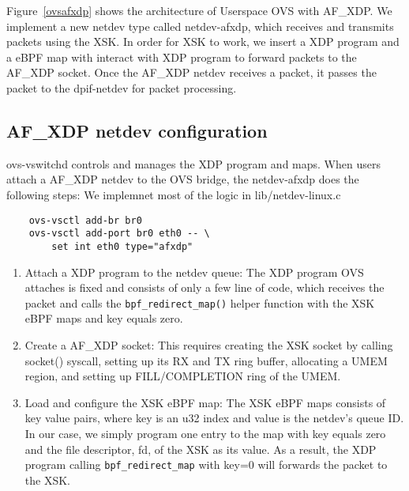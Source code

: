 \documentclass[10pt]{sigplanconf}
\newcommand{\mycomment}[1]{}
\begin{document}
Figure~\ref{ovsafxdp} shows the architecture of Userspace OVS with AF\_XDP.
We implement a new netdev type called netdev-afxdp, which receives and transmits
packets using the XSK.
In order for XSK to work, we insert a XDP program and a eBPF map with   
interact with XDP program to forward packets to the AF\_XDP socket.
Once the AF\_XDP netdev receives a packet, it passes the packet to the
dpif-netdev for packet processing.

\mycomment{
/* PMD: Poll modes drivers.  PMD accesses devices via polling to eliminate
 * the performance overhead of interrupt processing.  Therefore netdev can
 * not implement rx-wait for these devices.  dpif-netdev needs to poll
 * these device to check for recv buffer.  pmd-thread does polling for
 * devices assigned to itself.
 *
 * DPDK used PMD for accessing NIC.
 *}

\subsection{AF\_XDP netdev configuration}
ovs-vswitchd controls and manages the XDP program and maps.
When users attach a AF\_XDP netdev to the OVS bridge, the netdev-afxdp
does the following steps:
We implemnet most of the logic in lib/netdev-linux.c
{
\begin{verbatim}
    ovs-vsctl add-br br0
    ovs-vsctl add-port br0 eth0 -- \
        set int eth0 type="afxdp"
\end{verbatim}
}
\begin{enumerate}
\item Attach a XDP program to the netdev queue:
The XDP program OVS attaches is fixed and consists
of only a few line of code, which receives the packet and
calls the \texttt{bpf\_redirect\_map()} helper function with
the XSK eBPF maps and key equals zero.

\item Create a AF\_XDP socket:
This requires creating the XSK socket by calling socket() syscall,
setting up its RX and TX ring buffer, allocating a UMEM region,
and setting up FILL/COMPLETION ring of the UMEM.

\item Load and configure the XSK eBPF map:
The XSK eBPF maps consists of key value pairs, where key is an u32 index and value is
the netdev's queue ID.  In our case, we simply program one entry to the map with
key equals zero and the file descriptor, fd, of the XSK as its value.
As a result, the XDP program calling \texttt{bpf\_redirect\_map} with key=0 will
forwards the packet to the XSK.
\end{enumerate}
\end{document}
